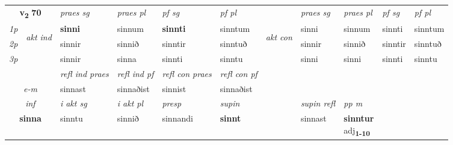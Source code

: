 \noindent
\begin{tabular}{lllllllllll} \toprule
\multicolumn{2}{c}{\textbf{v{\textsubscript{2}}} \Large{\textbf{70}}}  &  \textit{praes sg}  & \textit{praes pl}  &\textit{ pf sg} & \textit{pf pl} &  &  \textit{praes sg}  & \textit{praes pl}  & \textit{pf sg} & \textit{pf pl } \\*
	\cmidrule{3-6} \cmidrule{8-11}
 {\textit{1p}} & \multirow{3}{*}{\begin{turn}{90}\textit{akt ind}\end{turn}} & \textbf{sinni} & sinnum & \textbf{sinnti} & sinntum & \multirow{3}{*}{\begin{turn}{90}\textit{akt con}\end{turn}} &sinni & sinnum & sinnti & sinntum\\*
 {\textit{2p}} &  &  sinnir  & sinnið & sinntir & sinntuð & & sinnir & sinnið & sinntir & sinntuð \\*
{\textit{3p}} &  & sinnir & sinna & sinnti & sinntu & & sinni & sinni& sinnti & sinntu \\*
\cmidrule{3-6} \cmidrule{8-11}

 & & \textit{refl ind praes} & \textit{refl ind pf} & \textit{refl con praes} & \textit{refl con pf} \\*
 \multicolumn{2}{c}{ \textit{e-m} }& sinnast & sinnaðist & sinnist & sinnaðist \\*

\cmidrule{3-9}
   \multicolumn{2}{c}{\textit{inf}}  & \textit{i akt sg} & \textit{i akt pl}   & \textit{presp} & \textit{supin} && \textit{supin refl} & \textit{pp m} \\*
  \multicolumn{2}{c}{\textbf{sinna}} & sinntu  & sinnið   & sinnandi &  \textbf{sinnt} && sinnast & \specialcell{\textbf{sinntur} \\ adj\textbf{\textsubscript{1-10}}} \\*
\end{tabular}

